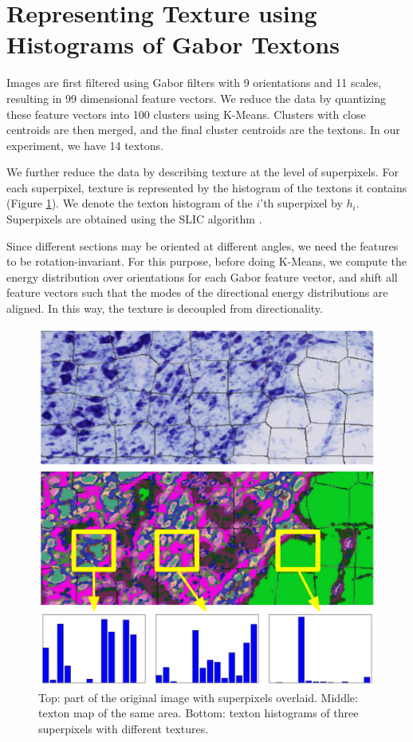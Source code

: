 \documentclass{llncs}
\begin{document}



\section{Representing Texture using Histograms of Gabor Textons} 

Images are first filtered using Gabor filters\cite{jain1990unsupervised} with 9 orientations and 11 scales, resulting in 99 dimensional feature vectors. We reduce the data by quantizing these feature vectors into 100 clusters using K-Means. Clusters with close centroids are then merged, and the final cluster centroids are the textons. In our experiment, we have 14 textons.


We further reduce the data by describing texture at the level of superpixels. For each superpixel, texture is represented by the histogram of the textons it contains (Figure \ref{fig:TextonHistComparison}). We denote the texton histogram of the $i$'th superpixel by $h_i$. Superpixels are obtained using the SLIC algorithm \cite{achanta2012slic}.

Since different sections may be oriented at different angles, 
we need the features to be rotation-invariant. For this purpose, before doing K-Means, we compute the energy distribution over orientations for each Gabor feature vector, and shift all feature vectors such that the modes of the directional energy distributions are aligned. In this way, the texture is decoupled from directionality.

\begin{figure}
	\includegraphics[width=.5\textwidth]{../figures/TextonHistComparisonWithArrows.png}
	\caption{Top: part of the original image with superpixels overlaid. Middle: texton map of the same area. Bottom: texton histograms of three superpixels with different textures.}
	\label{fig:TextonHistComparison}
\end{figure}
\end{document}
